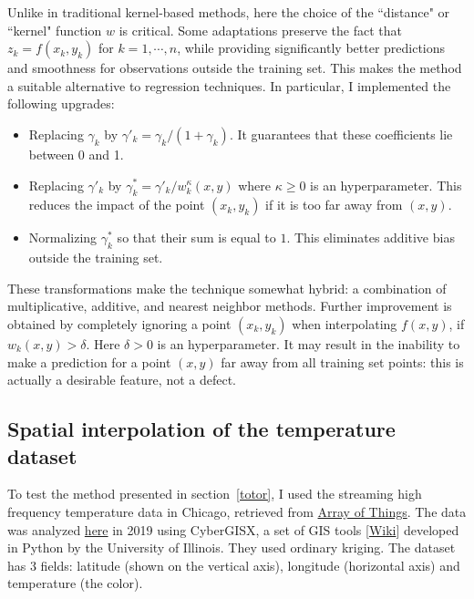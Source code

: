 \documentclass[oneside,10pt]{book}
\begin{document}
Unlike in traditional kernel-based methods, here the choice of the ``distance" or ``kernel" function $w$ is critical. Some adaptations preserve the fact that $z_k=f(x_k,y_k)$ for $k=1,\cdots,n$, while providing significantly better predictions and smoothness for observations outside the training set. This makes the method a suitable alternative to regression techniques. In particular, I implemented the following upgrades: \vspace{1ex}
\begin{itemize}
\item Replacing $\gamma_k$ by $\gamma'_k = \gamma_k /(1 + \gamma_k)$. It guarantees that these coefficients lie between 0 and 1.
\item Replacing $\gamma'_k$ by $\gamma^*_k = \gamma'_k / w_k^\kappa(x,y)$ where $\kappa\geq 0$ is an hyperparameter. This reduces the impact of the point $(x_k,y_k)$ if it is too far away from $(x,y)$.
\item Normalizing $\gamma^*_k$ so that their sum is equal to $1$. This eliminates additive bias outside the training set.
\end{itemize}\vspace{1ex}

\noindent These transformations make the technique somewhat hybrid: a combination of multiplicative, additive, and nearest neighbor methods. Further improvement is obtained by completely ignoring a point $(x_k,y_k)$ when interpolating $f(x,y)$, if 
$w_k(x,y)>\delta$. Here $\delta > 0$ is an hyperparameter. It may result in the inability to make a prediction for a point $(x,y)$ far away from all training set points: this is actually a desirable feature, not a defect.

\subsection{Spatial interpolation of the temperature dataset}\label{tptyr}

To test the method presented in section~\ref{totor}, I used the streaming high frequency temperature data in Chicago, retrieved from \href{https://arrayofthings.github.io/}{Array of Things}. The data was analyzed \href{https://cybergisxhub.cigi.illinois.edu/notebook/spatial-interpolation/}{here} 
in 2019 using CyberGISX, a set of \textcolor{index}{GIS} tools 
[\href{https://en.wikipedia.org/wiki/Geographic_information_system}{Wiki}] developed in Python by the University of Illinois. They used ordinary kriging.  The dataset has 3 fields: latitude (shown on the vertical axis), longitude (horizontal axis) and temperature (the color). 
\end{document}
